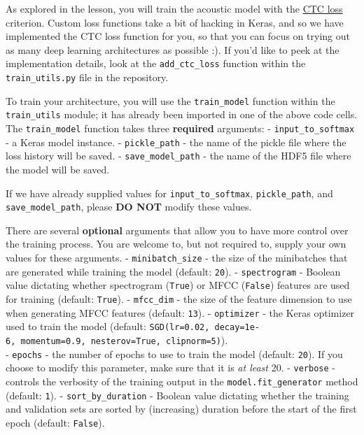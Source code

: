 \documentclass[11pt]{article}
\begin{document}
    As explored in the lesson, you will train the acoustic model with the
\href{http://www.cs.toronto.edu/~graves/icml_2006.pdf}{CTC loss}
criterion. Custom loss functions take a bit of hacking in Keras, and so
we have implemented the CTC loss function for you, so that you can focus
on trying out as many deep learning architectures as possible :). If
you'd like to peek at the implementation details, look at the
\texttt{add\_ctc\_loss} function within the \texttt{train\_utils.py}
file in the repository.

To train your architecture, you will use the \texttt{train\_model}
function within the \texttt{train\_utils} module; it has already been
imported in one of the above code cells. The \texttt{train\_model}
function takes three \textbf{required} arguments: -
\texttt{input\_to\_softmax} - a Keras model instance. -
\texttt{pickle\_path} - the name of the pickle file where the loss
history will be saved. - \texttt{save\_model\_path} - the name of the
HDF5 file where the model will be saved.

If we have already supplied values for \texttt{input\_to\_softmax},
\texttt{pickle\_path}, and \texttt{save\_model\_path}, please \textbf{DO
NOT} modify these values.

There are several \textbf{optional} arguments that allow you to have
more control over the training process. You are welcome to, but not
required to, supply your own values for these arguments. -
\texttt{minibatch\_size} - the size of the minibatches that are
generated while training the model (default: \texttt{20}). -
\texttt{spectrogram} - Boolean value dictating whether spectrogram
(\texttt{True}) or MFCC (\texttt{False}) features are used for training
(default: \texttt{True}). - \texttt{mfcc\_dim} - the size of the feature
dimension to use when generating MFCC features (default: \texttt{13}). -
\texttt{optimizer} - the Keras optimizer used to train the model
(default:
\texttt{SGD(lr=0.02,\ decay=1e-6,\ momentum=0.9,\ nesterov=True,\ clipnorm=5)}).\\
- \texttt{epochs} - the number of epochs to use to train the model
(default: \texttt{20}). If you choose to modify this parameter, make
sure that it is \emph{at least} 20. - \texttt{verbose} - controls the
verbosity of the training output in the \texttt{model.fit\_generator}
method (default: \texttt{1}). - \texttt{sort\_by\_duration} - Boolean
value dictating whether the training and validation sets are sorted by
(increasing) duration before the start of the first epoch (default:
\texttt{False}).
\end{document}
